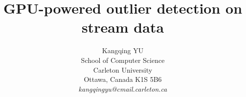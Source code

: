 \documentclass[11pt]{article}       %
\begin{document}


\title{GPU-powered outlier detection on stream data}


\author{
Kangqing YU\\
School of Computer Science\\
Carleton University\\
Ottawa, Canada K1S 5B6\\
{\em kangqingyu@cmail.carleton.ca}
} %

\maketitle
\end{document}
